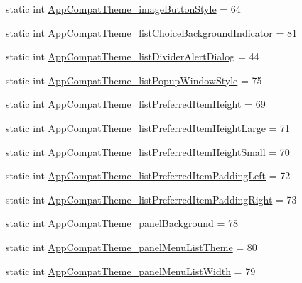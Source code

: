 \begin{DoxyCompactItemize}
\item 
static int \hyperlink{classandroid_1_1support_1_1v7_1_1mediarouter_1_1R_1_1styleable_a9168d9e2a7a62b5b606d8a6429c93118}{App\+Compat\+Theme\+\_\+image\+Button\+Style} = 64
\item 
static int \hyperlink{classandroid_1_1support_1_1v7_1_1mediarouter_1_1R_1_1styleable_a0231c101569fa781bb9a5ecba4ff728f}{App\+Compat\+Theme\+\_\+list\+Choice\+Background\+Indicator} = 81
\item 
static int \hyperlink{classandroid_1_1support_1_1v7_1_1mediarouter_1_1R_1_1styleable_ac591345fbb2242bdd017831f3945bb54}{App\+Compat\+Theme\+\_\+list\+Divider\+Alert\+Dialog} = 44
\item 
static int \hyperlink{classandroid_1_1support_1_1v7_1_1mediarouter_1_1R_1_1styleable_a20960f3bfbaeac45f2f88f8fdedb6eb8}{App\+Compat\+Theme\+\_\+list\+Popup\+Window\+Style} = 75
\item 
static int \hyperlink{classandroid_1_1support_1_1v7_1_1mediarouter_1_1R_1_1styleable_a93ebe3b2983e9056ade662b59bf906f0}{App\+Compat\+Theme\+\_\+list\+Preferred\+Item\+Height} = 69
\item 
static int \hyperlink{classandroid_1_1support_1_1v7_1_1mediarouter_1_1R_1_1styleable_ab27c1a75e8d929dff26ffcc92b6ae2e9}{App\+Compat\+Theme\+\_\+list\+Preferred\+Item\+Height\+Large} = 71
\item 
static int \hyperlink{classandroid_1_1support_1_1v7_1_1mediarouter_1_1R_1_1styleable_af77cd07fa887ba15990b370f984b0d68}{App\+Compat\+Theme\+\_\+list\+Preferred\+Item\+Height\+Small} = 70
\item 
static int \hyperlink{classandroid_1_1support_1_1v7_1_1mediarouter_1_1R_1_1styleable_adcdce820a384c778b4746b452ffec297}{App\+Compat\+Theme\+\_\+list\+Preferred\+Item\+Padding\+Left} = 72
\item 
static int \hyperlink{classandroid_1_1support_1_1v7_1_1mediarouter_1_1R_1_1styleable_ad7f8ba5273c36438148cf9ec4c052103}{App\+Compat\+Theme\+\_\+list\+Preferred\+Item\+Padding\+Right} = 73
\item 
static int \hyperlink{classandroid_1_1support_1_1v7_1_1mediarouter_1_1R_1_1styleable_a13f22c89f103a45bf6f2cec79f941159}{App\+Compat\+Theme\+\_\+panel\+Background} = 78
\item 
static int \hyperlink{classandroid_1_1support_1_1v7_1_1mediarouter_1_1R_1_1styleable_a7c342f6f92ed7ad34951015f855a9db3}{App\+Compat\+Theme\+\_\+panel\+Menu\+List\+Theme} = 80
\item 
static int \hyperlink{classandroid_1_1support_1_1v7_1_1mediarouter_1_1R_1_1styleable_ab0f7f7adcabb13c0fbfe3555aa27d52e}{App\+Compat\+Theme\+\_\+panel\+Menu\+List\+Width} = 79

\end{DoxyCompactItemize}
